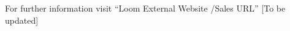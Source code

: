 \documentclass[letterpaper,10pt,english]{sphinxhowto}
\begin{document}
For further information visit “Loom External Website /Sales URL” {[}To be updated{]}

\begin{figure}[htbp]
\centering

\noindent{}
\end{figure}



\renewcommand{\indexname}{Index}
\printindex
\end{document}
